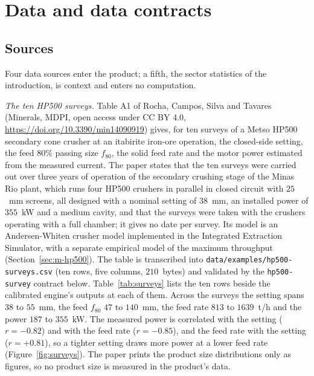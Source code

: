 \section{Data and data contracts}\label{sec:data}

\subsection{Sources}\label{sec:data-sources}

Four data sources enter the product; a fifth, the sector statistics of the introduction, is context and enters no
computation.

\emph{The ten HP500 surveys.} Table A1 of Rocha, Campos, Silva and Tavares~\cite{rocha2024} (Minerals, MDPI, open access
under CC BY 4.0, \url{https://doi.org/10.3390/min14090919}) gives, for ten surveys of a Metso HP500 secondary cone crusher at
an itabirite iron-ore operation, the closed-side setting, the feed $80\%$ passing size $f_{80}$, the solid feed rate and the
motor power estimated from the measured current. The paper states that the ten surveys were carried out over three years
of operation of the secondary crushing stage of the Minas Rio plant, which runs four HP500 crushers in parallel in closed
circuit with $25$~mm screens, all designed with a nominal setting of $38$~mm, an installed power of $355$~kW and a medium
cavity, and that the surveys were taken with the crushers operating with a full chamber; it gives no date per survey. Its
model is an Andersen-Whiten crusher model implemented in the Integrated Extraction Simulator, with a separate empirical
model of the maximum throughput (Section~\ref{sec:m-hp500}). The table is transcribed into \texttt{data/\allowbreak{}examples/\allowbreak{}hp500-surveys.csv}
(ten rows, five columns, $210$~bytes) and validated by the \texttt{hp500-survey} contract below. Table~\ref{tab:surveys}
lists the ten rows beside the calibrated engine's outputs at each of them. Across the surveys the setting spans $38$ to
$55$~mm, the feed $f_{80}$ $47$ to $140$~mm, the feed rate $813$ to $1639$~t/h and the power $187$ to $355$~kW. The measured
power is correlated with the setting ($r=-0.82$) and with the feed rate ($r=-0.85$), and the feed rate with the setting
($r=+0.81$), so a tighter setting draws more power at a lower feed rate (Figure~\ref{fig:surveys}). The paper prints the
product size distributions only as figures, so no product size is measured in the product's data.


